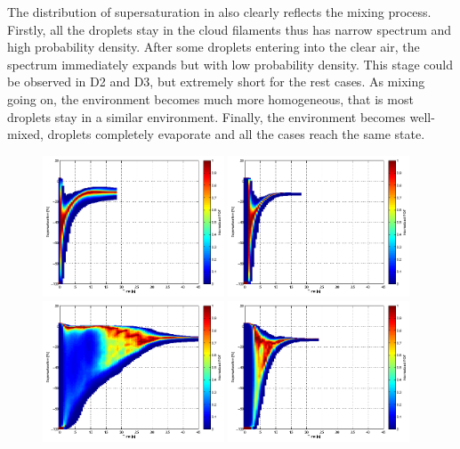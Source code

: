\documentclass[draft,jgrga]{AGUTeX}
\begin{document}
\begin{article}
The distribution of supersaturation in  also clearly reflects the mixing process. Firstly, all the droplets stay in the cloud filaments thus has narrow spectrum and high probability density. After some droplets entering into the clear air, the spectrum immediately expands but with low probability density. This stage could be observed in D2 and D3, but extremely short for the rest cases. As mixing going on, the environment becomes much more homogeneous, that is most droplets stay in a similar environment. Finally, the environment becomes well-mixed, droplets completely evaporate and all the cases reach the same state.
\begin{figure}[H]\centering
\includegraphics[width=0.48\textwidth]{Figures/pdf_supersat_d1}
\includegraphics[width=0.48\textwidth]{Figures/pdf_supersat_f1}\\
\includegraphics[width=0.48\textwidth]{Figures/pdf_supersat_d2}
\includegraphics[width=0.48\textwidth]{Figures/pdf_supersat_f2}\\

\end{figure}
\end{article}
\end{document}
